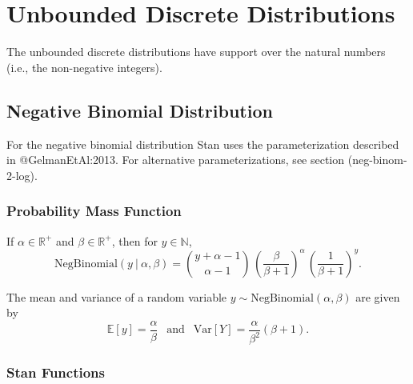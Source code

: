 \begin{description}
{\begin{description}
\begin{description}     \end{description}


\chapter{Unbounded Discrete Distributions}


The unbounded discrete distributions have support over the natural numbers (i.e., the non-negative integers).


\section{Negative Binomial Distribution}


For the negative binomial distribution Stan uses the parameterization described in @GelmanEtAl:2013.  For alternative parameterizations, see section \@ref(neg-binom-2-log).


\subsection{Probability Mass Function}


If $\alpha \in \mathbb{R}^+$ and $\beta \in \mathbb{R}^+$, then for $y \in \mathbb{N}$, \[ \text{NegBinomial}(y~|~\alpha,\beta)  = \binom{y + \alpha - 1}{\alpha - 1} \, \left( \frac{\beta}{\beta+1} \right)^{\!\alpha} \, \left( \frac{1}{\beta + 1} \right)^{\!y} \!. \] 

The mean and variance of a random variable $y \sim \text{NegBinomial}(\alpha,\beta)$ are given by \[ \mathbb{E}[y] = \frac{\alpha}{\beta} \ \ \text{ and } \ \ \text{Var}[Y] = \frac{\alpha}{\beta^2} (\beta + 1). \] 



\subsection{Stan Functions}



\end{description}}
\end{description}
